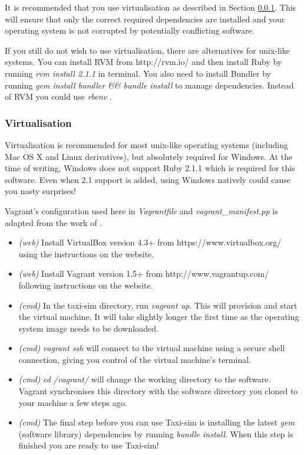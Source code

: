 It is recommended that you use virtualisation as described in Section
\ref{sec:user_manual:installation:virtualisation}. This will ensure that only
the correct required dependencies are installed and your operating system is
not corrupted by potentially conflicting software. 

If you still do not wish to use virtualisation, there are alternatives for
unix-like systems. You can install RVM \parencite{Rvm} from http://rvm.io/ and
then install Ruby by running \textit{rvm install 2.1.1} in terminal. You also
need to install Bundler \parencite{Bundler} by running \textit{gem install
bundler && bundle install} to manage dependencies. Instead of RVM you could use
\textit{rbenv} \parencite{Rbenv}.


\subsubsection{Virtualisation}
\label{sec:user_manual:installation:virtualisation}

Virtualisation is recommended for most unix-like operating systems (including
Mac OS X and Linux derivatives), but absolutely required for Windows. At the
time of writing, Windows does not support Ruby 2.1.1 which is required for this
software. Even when 2.1 support is added, using Windows natively could cause
you nasty surprises!

Vagrant's configuration used here in \textit{Vagrantfile} and
\textit{vagrant_manifest.pp} is adapted from the work of
\textcite{Rails+dev+box}.

\begin{itemize}
  \item \textit{(web)} Install VirtualBox version 4.3+
        \parencite{Virtualbox} from
        https://www.virtualbox.org/ using the instructions on the website.
  \item \textit{(web)} Install Vagrant version 1.5+ \parencite{Vagrant} from 
        http://www.vagrantup.com/ following instructions on the website.
  \item \textit{(cmd)} In the taxi-sim directory, run \textit{vagrant up}. This
        will provision and start the virtual machine. It will take slightly
        longer the first time as the operating system image needs to be
        downloaded.
  \item \textit{(cmd)} \textit{vagrant ssh} will connect to the virtual machine 
        using a secure shell connection, giving you control of the virtual
        machine's terminal.
  \item \textit{(cmd)} \textit{cd /vagrant/} will change the working
        directory to the software. Vagrant synchronises this directory with the
        software directory you cloned to your machine a few steps ago.
  \item \textit{(cmd)} The final step before you can use Taxi-sim is installing
        the latest \textit{gem} (software library) dependencies by running 
        \textit{bundle install}. When this step is finished you are ready to
        use Taxi-sim!
\end{itemize}


